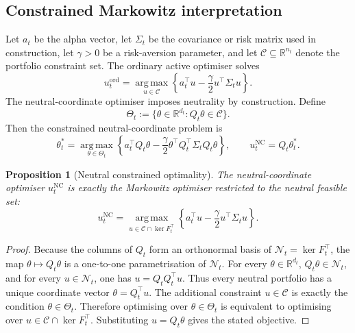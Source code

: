 \documentclass[11pt]{article}
\newtheorem{proposition}{Proposition}
\newcommand{\R}{\mathbb{R}}
\newcommand{\N}{\mathcal{N}}
\newcommand{\argmax}{\operatorname*{arg\,max}}
\begin{document}
\subsection{Constrained Markowitz interpretation}

Let $a_t$ be the alpha vector, let $\Sigma_t$ be the covariance or risk matrix used in construction, let
$\gamma>0$ be a risk-aversion parameter, and let $\mathcal C\subseteq\R^{n_t}$ denote the portfolio
constraint set.  The ordinary active optimiser solves
\begin{equation}
        u_t^{\mathrm{ord}}
        =\argmax_{u\in\mathcal C}\left\{a_t^\top u-\frac{\gamma}{2}u^\top\Sigma_tu\right\}.
\end{equation}
The neutral-coordinate optimiser imposes neutrality by construction.  Define
\begin{equation}
        \Theta_t:=\{\theta\in\R^{d_t}:Q_t\theta\in\mathcal C\}.
\end{equation}
Then the constrained neutral-coordinate problem is
\begin{equation}
        \theta_t^\ast
        =\argmax_{\theta\in\Theta_t}
        \left\{a_t^\top Q_t\theta-\frac{\gamma}{2}\theta^\top Q_t^\top\Sigma_tQ_t\theta\right\},
        \qquad u_t^{\mathrm{NC}}=Q_t\theta_t^\ast.
\end{equation}

\begin{proposition}[Neutral constrained optimality]
\label{prop:neutral-constrained-optimality}
The neutral-coordinate optimiser $u_t^{\mathrm{NC}}$ is exactly the Markowitz optimiser restricted to the neutral feasible
set:
\begin{equation}
        u_t^{\mathrm{NC}}
        =\argmax_{u\in\mathcal C\cap\ker F_t^\top}
        \left\{a_t^\top u-\frac{\gamma}{2}u^\top\Sigma_tu\right\}.
\end{equation}
\end{proposition}

\begin{proof}
Because the columns of $Q_t$ form an orthonormal basis of $\N_t=\ker F_t^\top$, the map
$\theta\mapsto Q_t\theta$ is a one-to-one parametrisation of $\N_t$.  For every $\theta\in\R^{d_t}$,
$Q_t\theta\in\N_t$, and for every $u\in\N_t$, one has $u=Q_tQ_t^\top u$.  Thus every neutral portfolio
has a unique coordinate vector $\theta=Q_t^\top u$.  The additional constraint $u\in\mathcal C$ is
exactly the condition $\theta\in\Theta_t$.  Therefore optimising over $\theta\in\Theta_t$ is equivalent
to optimising over $u\in\mathcal C\cap\ker F_t^\top$.  Substituting $u=Q_t\theta$ gives the stated
objective.
\end{proof}
\end{document}
